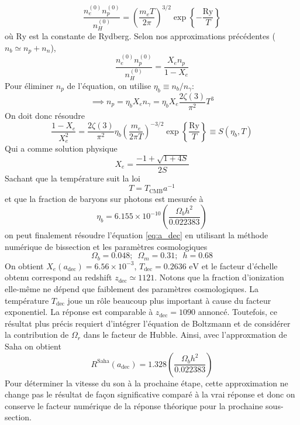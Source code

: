 \documentclass{article}
\numberwithin{equation}{section}
\begin{document}
\[
        \frac{n_e^{(0)} n_p^{(0)}}{n_H^{(0)}} 
        = \left( \frac{m_e T}{2 \pi} \right)^{3/2}
        \exp \left\{ -\frac{\text{Ry}}{T} \right\} 
\]
où $\text{Ry}$ est la constante de Rydberg.
Selon nos approximations précédentes ($n_b \simeq n_p + n_n$),
\[
        \frac{n_e^{(0)} n_p^{(0)}}{n_H^{(0)}}
        = \frac{X_en_p}{1 - X_e}
\]
Pour éliminer $n_p$ de l'équation, on utilise $\eta_b \equiv n_b / n_\gamma$:
\[
        \implies n_p = \eta_b X_e n_\gamma = \eta_b X_e\frac{2 \zeta(3)}{\pi^2}T^3
\]
On doit donc résoudre
\[
        \frac{1 - X_e}{X_e^2} = \frac{2 \zeta(3)}{\pi^2}\eta_b \left( \frac{m_e}{2 \pi T} \right)^{-3/2}
        \exp \left\{ \frac{\text{Ry}}{T} \right\} \equiv S(\eta_b, T)
\]
Qui a comme solution physique
\[
        X_e = \frac{-1 + \sqrt{1 + 4S}}{2S}
\]
Sachant que la température suit la loi
\[
        T = T_{\text{CMB}}a^{-1}
\]
et que la fraction de baryons sur photons est mesurée à
\[
        \eta_b = 6.155\times 10^{-10} \left( \frac{\Omega_b h^2}{0.022383} \right)
\]
on peut finalement résoudre l'équation \ref{eq:a_dec} en utilisant la 
méthode numérique de bissection et les paramètres cosmologiques 
\[
        \Omega_b = 0.048;\,\,\, \Omega_m = 0.31;\,\,\,h=0.68
\]
On obtient $X_e(a_{\text{dec}}) = 6.56\times 10^{-3}$, $T_{\text{dec}} = 0.2636\,\,\text{eV}$ 
et le facteur d'échelle 
obtenu correspond 
au redshift $z_{\text{dec}} \simeq 1121$. Notons que la fraction d'ionization 
elle-même ne dépend que faiblement des paramètres cosmologiques. La température $T_{\text{dec}}$
joue un rôle beaucoup plus important à cause du facteur exponentiel. 
La réponse est comparable à
$z_{\text{dec}} = 1090$ annoncé. Toutefois, ce résultat plus précis 
requiert d'intégrer l'équation de 
Boltzmann et de considérer la contribution de $\Omega_r$ 
dans le facteur de Hubble. Ainsi, avec l'approxmation de Saha on obtient
\[
        \boxed{R^{\text{Saha}}(a_{\text{dec}}) = 1.328 \left( \frac{\Omega_b h^2}{0.022383} \right)}
\]
Pour déterminer la vitesse du son à la prochaine étape, cette approximation ne change 
pas le résultat de façon significative comparé à la vrai réponse et donc on conserve 
le facteur numérique de la réponse théorique pour la prochaine sous-section.
\end{document}
